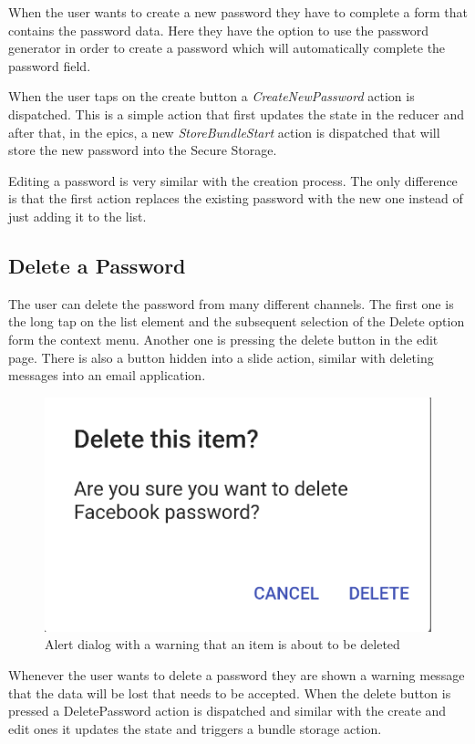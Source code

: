 \documentclass[a4paper,12pt]{report}
\begin{document}
When the user wants to create a new password they have to complete a form that
contains the password data. Here they have the option to use the password
generator in order to create a password which will automatically complete the
password field.

When the user taps on the create button a \textit{CreateNewPassword} action is
dispatched. This is a simple action that first updates the state in the reducer
and after that, in the epics, a new \textit{StoreBundleStart} action is
dispatched that will store the new password into the Secure Storage.

Editing a password is very similar with the creation process. The only
difference is that the first action replaces the existing password with the new
one instead of just adding it to the list.

\subsection{Delete a Password}

The user can delete the password from many different channels. The first one is
the long tap on the list element and the subsequent selection of the Delete
option form the context menu. Another one is pressing the delete button in the
edit page. There is also a button hidden into a slide action, similar with
deleting messages into an email application.

\begin{figure}[H]
    \centering
    \includegraphics[scale=0.6]{images/app/warn_delete_password.png}
    \caption{Alert dialog with a warning that an item is about to be deleted}\label{fig:warn_delete_password}
\end{figure}

Whenever the user wants to delete a password they are shown a warning message
that the data will be lost that needs to be accepted. When the delete button is
pressed a DeletePassword action is dispatched and similar with the create and
edit ones it updates the state and triggers a bundle storage action.
\end{document}
